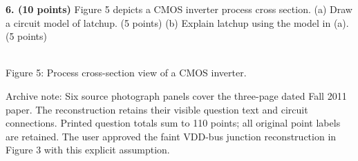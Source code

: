 \documentclass[10pt]{article}
\begin{document}
\textbf{6. (10 points)} Figure 5 depicts a CMOS inverter process cross section. (a) Draw a circuit model of latchup. (5 points) (b) Explain latchup using the model in (a). (5 points)
\begin{center}\\Figure 5: Process cross-section view of a CMOS inverter.\end{center}
\small Archive note: Six source photograph panels cover the three-page dated Fall 2011 paper. The reconstruction retains their visible question text and circuit connections. Printed question totals sum to 110 points; all original point labels are retained. The user approved the faint VDD-bus junction reconstruction in Figure 3 with this explicit assumption.
\end{document}
